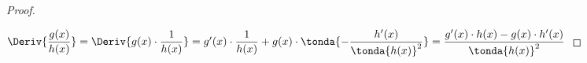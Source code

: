 \begin{proof}
~

\noindent
\(\Deriv{\dfrac{g(x)}{h(x)}} = \Deriv{g(x) \cdot \dfrac{1}{h(x)}} = 
  g'(x) \cdot \dfrac{1}{h(x)} + 
  g(x) \cdot \tonda{- \dfrac {h'(x)}{\tonda{h(x)}^2}}=
  \dfrac{g'(x) \cdot h(x) - g(x) \cdot h'(x)}{\tonda{h(x)}^2}
\)

% 
% 

\end{proof}
